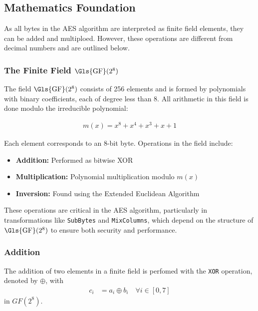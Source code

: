 \subsection{Mathematics Foundation}

As all bytes in the \gls{AES} algorithm are interpreted as finite field elements, they can be added and multiploed. 
However, these operations are different from decimal numbers and are outlined below.


\subsubsection{The Finite Field \texorpdfstring{$\mathrm{\Gls{GF}}(2^8)$}{\Gls{GF}(2^8)}}
\label{sec:galois}

The field $\mathrm{\Gls{GF}}(2^8)$ consists of 256 elements and is formed by polynomials with binary coefficients, each of degree less than 8. All arithmetic in this field is done modulo the irreducible polynomial:

\begin{align}
    m(x) = x^8 + x^4 + x^3 + x + 1 \label{eq:irred-poly}
\end{align}

Each element corresponds to an 8-bit byte. Operations in the field include:
\begin{itemize}
    \item \textbf{Addition:} Performed as bitwise XOR
    \item \textbf{Multiplication:} Polynomial multiplication modulo $m(x)$
    \item \textbf{Inversion:} Found using the Extended Euclidean Algorithm
\end{itemize}

These operations are critical in the \Gls{AES} algorithm, particularly in transformations like \texttt{SubBytes} and \texttt{MixColumns}, which depend on the structure of $\mathrm{\Gls{GF}}(2^8)$ to ensure both security and performance.

\subsubsection{Addition}
\label{sec:addition}

The addition of two elements in a finite field is perfomed with the \texttt{XOR} operation, denoted by $\oplus$, with
\begin{align}
    c_i &= a_i \oplus b_i \quad \forall i \in [0, 7]
\end{align}
in $GF(2^8)$.



